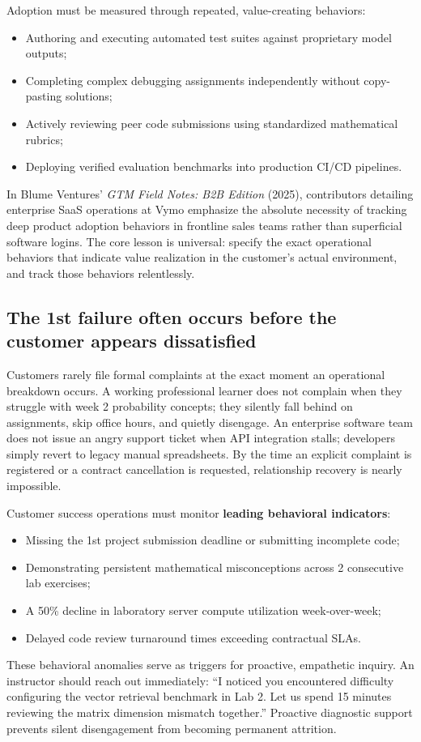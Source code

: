 Adoption must be measured through repeated, value-creating behaviors:
\begin{itemize}
\item Authoring and executing automated test suites against proprietary model outputs;
\item Completing complex debugging assignments independently without copy-pasting solutions;
\item Actively reviewing peer code submissions using standardized mathematical rubrics;
\item Deploying verified evaluation benchmarks into production CI/CD pipelines.
\end{itemize}
In Blume Ventures' \textit{GTM Field Notes: B2B Edition} (2025), contributors detailing enterprise SaaS operations at Vymo emphasize the absolute necessity of tracking deep product adoption behaviors in frontline sales teams rather than superficial software logins. The core lesson is universal: specify the exact operational behaviors that indicate value realization in the customer's actual environment, and track those behaviors relentlessly.

\subsection{The 1st failure often occurs before the customer appears dissatisfied}

Customers rarely file formal complaints at the exact moment an operational breakdown occurs. A working professional learner does not complain when they struggle with week 2 probability concepts; they silently fall behind on assignments, skip office hours, and quietly disengage. An enterprise software team does not issue an angry support ticket when API integration stalls; developers simply revert to legacy manual spreadsheets. By the time an explicit complaint is registered or a contract cancellation is requested, relationship recovery is nearly impossible.

Customer success operations must monitor \textbf{leading behavioral indicators}:
\begin{itemize}
\item Missing the 1st project submission deadline or submitting incomplete code;
\item Demonstrating persistent mathematical misconceptions across 2 consecutive lab exercises;
\item A 50\% decline in laboratory server compute utilization week-over-week;
\item Delayed code review turnaround times exceeding contractual SLAs.
\end{itemize}
These behavioral anomalies serve as triggers for proactive, empathetic inquiry. An instructor should reach out immediately: ``I noticed you encountered difficulty configuring the vector retrieval benchmark in Lab 2. Let us spend 15 minutes reviewing the matrix dimension mismatch together.'' Proactive diagnostic support prevents silent disengagement from becoming permanent attrition.

